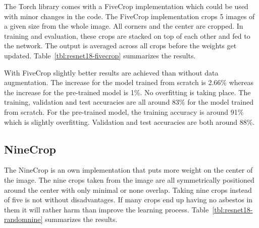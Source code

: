The Torch library comes with a FiveCrop implementation which could be used with minor changes in the code. The FiveCrop implementation crops 5 images of a given size from the whole image. All corners and the center are cropped. In training and evaluation, these crops are stacked on top of each other and fed to the network. The output is averaged across all crops before the weights get updated. Table~\ref{tbl:resnet18-fivecrop} summarizes the results.\\


\begin{table}[!h] \centering
{}
\caption{Resnet18 FiveCrop Implementation with and without pre-training. FINAL (regular) means ResNet18 with the resizing of the image instead of cropping and averaging.}
\label{tbl:resnet18-fivecrop}
\end{table}

With FiveCrop slightly better results are achieved than without data augmentation. The increase for the model trained from scratch is 2.66\% whereas the increase for the pre-trained model is 1\%. No overfitting is taking place. The training, validation and test accuracies are all around 83\% for the model trained from scratch. For the pre-trained model, the training accuracy is around 91\% which is slightly overfitting. Validation and test accuracies are both around 88\%.

\subsection{NineCrop}

The NineCrop is an own implementation that puts more weight on the center of the image. The nine crops taken from the image are all symmetrically positioned around the center with only minimal or none overlap. Taking nine crops instead of five is not without disadvantages. If many crops end up having no asbestos in them it will rather harm than improve the learning process. Table~\ref{tbl:resnet18-randomnine} summarizes the results.\\

